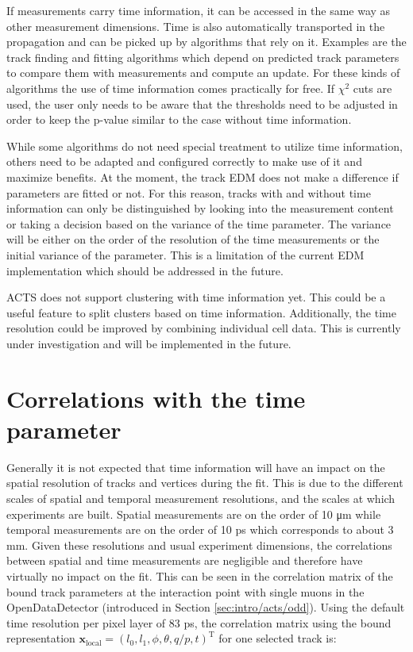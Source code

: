 If measurements carry time information, it can be accessed in the same way as other measurement dimensions. Time is also automatically transported in the propagation and can be picked up by algorithms that rely on it. Examples are the track finding and fitting algorithms which depend on predicted track parameters to compare them with measurements and compute an update. For these kinds of algorithms the use of time information comes practically for free. If $\chi^2$ cuts are used, the user only needs to be aware that the thresholds need to be adjusted in order to keep the p-value similar to the case without time information.

While some algorithms do not need special treatment to utilize time information, others need to be adapted and configured correctly to make use of it and maximize benefits. At the moment, the track EDM does not make a difference if parameters are fitted or not. For this reason, tracks with and without time information can only be distinguished by looking into the measurement content or taking a decision based on the variance of the time parameter. The variance will be either on the order of the resolution of the time measurements or the initial variance of the parameter. This is a limitation of the current EDM implementation which should be addressed in the future.

ACTS does not support clustering with time information yet. This could be a useful feature to split clusters based on time information. Additionally, the time resolution could be improved by combining individual cell data. This is currently under investigation and will be implemented in the future.

\section{Correlations with the time parameter}

Generally it is not expected that time information will have an impact on the spatial resolution of tracks and vertices during the fit. This is due to the different scales of spatial and temporal measurement resolutions, and the scales at which experiments are built. Spatial measurements are on the order of 10 μm while temporal measurements are on the order of 10 ps which corresponds to about 3 mm. Given these resolutions and usual experiment dimensions, the correlations between spatial and time measurements are negligible and therefore have virtually no impact on the fit. This can be seen in the correlation matrix of the bound track parameters at the interaction point with single muons in the OpenDataDetector (introduced in Section \ref{sec:intro/acts/odd}). Using the default time resolution per pixel layer of 83 ps, the correlation matrix using the bound representation $\mathbf{x}_\text{local} = \left(l_0, l_1, \phi, \theta, q/p, t\right)^\mathrm{T}$ for one selected track is:

